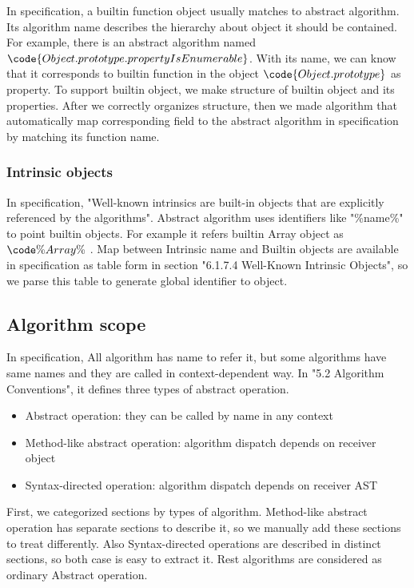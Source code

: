  In specification, a builtin function object usually matches to abstract algorithm. Its algorithm name
 describes the hierarchy about object it should be contained. For example, there is an abstract algorithm named \( \code{ Object.prototype.propertyIsEnumerable } \). With its name,
 we can know that it corresponds to builtin function in the object \( \code{ Object.prototype } \) as property.
 To support builtin object, we make structure of builtin object and its properties.
 After we correctly organizes structure, then we made algorithm that automatically map corresponding field to the abstract algorithm in specification by matching its function name.
 
 \subsubsection{Intrinsic objects}

 In specification, "Well-known intrinsics are built-in objects that are explicitly referenced by the algorithms".
 Abstract algorithm uses identifiers like "\%name\%" to point builtin objects. For example it refers builtin Array object as \( \code{\%Array\%} \) .
 Map between Intrinsic name and Builtin objects are available in specification as table form in section "6.1.7.4 Well-Known Intrinsic Objects", so we parse this table to generate global identifier to object.

\subsection{Algorithm scope}

 In specification, All algorithm has name to refer it, but some algorithms have same names and they are called in context-dependent way.
In "5.2 Algorithm Conventions", it defines three types of abstract operation.
 \begin{itemize}
  \item Abstract operation: they can be called by name in any context
  \item Method-like abstract operation: algorithm dispatch depends on receiver object
  \item Syntax-directed operation: algorithm dispatch depends on receiver AST
  \end{itemize}

First, we categorized sections by types of algorithm.
Method-like abstract operation has separate sections to describe it, so we manually add these sections to treat differently.
Also Syntax-directed operations are described in distinct sections, so both case is easy to extract it.
Rest algorithms are considered as ordinary Abstract operation.

